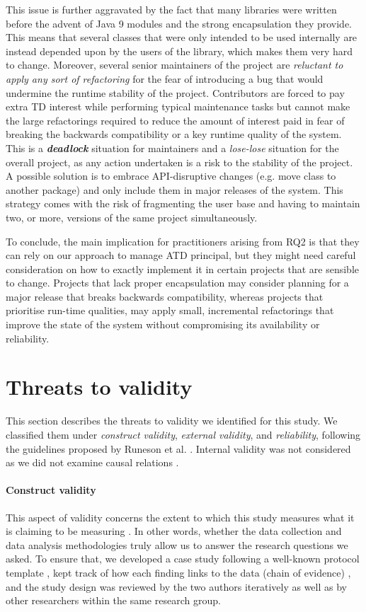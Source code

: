 This issue is further aggravated by the fact that many libraries were written before the advent of Java 9 modules and the strong encapsulation they provide. This means that several classes that were only intended to be used internally are instead depended upon by the users of the library, which makes them very hard to change.
Moreover, several senior maintainers of the project are \emph{reluctant to apply any sort of refactoring} for the fear of introducing a bug that would undermine the runtime stability of the project.
Contributors are forced to pay extra TD interest while performing typical maintenance tasks but cannot make the large refactorings required to reduce the amount of interest paid in fear of breaking the backwards compatibility or a key runtime quality of the system. 
This is a \textbf{\emph{deadlock}} situation for maintainers and a \emph{lose-lose} situation for the overall project, as any action undertaken is a risk to the stability of the project.
A possible solution is to embrace API-disruptive changes (e.g. move class to another package) and only include them in major releases of the system.
This strategy comes with the risk of fragmenting the user base and having to maintain two, or more, versions of the same project simultaneously.
 
To conclude, the main implication for practitioners arising from RQ2 is that they can rely on our approach to manage ATD principal, but they might need careful consideration on how to exactly implement it in certain projects that are sensible to change.
Projects that lack proper encapsulation may consider planning for a major release that breaks backwards compatibility, whereas projects that prioritise run-time qualities, may apply small, incremental refactorings that improve the state of the system without compromising its availability or reliability.


\section{Threats to validity}\label{c6:sec:threats-to-validity}
This section describes the threats to validity we identified for this study.
We classified them under \emph{construct validity}, \emph{external validity}, and \emph{reliability}, following the guidelines proposed by Runeson et al. \cite{Runeson2012}.
Internal validity was not considered as we did not examine causal relations \cite{Runeson2012}.

\paragraph*{Construct validity}
This aspect of validity concerns the extent to which this study measures what it is claiming to be measuring \cite{Runeson2012}. 
In other words, whether the data collection and data analysis methodologies truly allow us to answer the research questions we asked.
To ensure that, we developed a case study following a well-known protocol template \cite{Brereton2008}, kept track of how each finding links to the data (chain of evidence) \cite{Runeson2012}, and the study design was reviewed by the two authors iteratively as well as by other researchers within the same research group.

